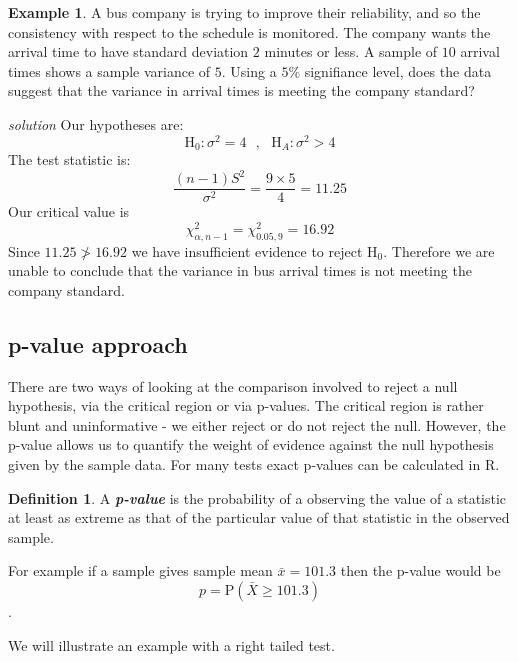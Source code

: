 \documentclass[
]{book}
\theoremstyle{definition}
\newtheorem{definition}{Definition}[chapter]
\theoremstyle{definition}
\newtheorem{example}{Example}[chapter]
\theoremstyle{definition}
\theoremstyle{definition}
\theoremstyle{remark}
\begin{document}
\begin{example}
A bus company is trying to improve their reliability, and so the consistency with respect to the schedule is monitored. The company wants the arrival time to have standard deviation \(2\) minutes or less. A sample of \(10\) arrival times shows a sample variance of \(5\). Using a \(5\%\) signifiance level, does the data suggest that the variance in arrival times is meeting the company standard?

\emph{solution}
Our hypotheses are:
\[\text{H}_0: \sigma^2=4 \ \ \ , \ \ \ \text{H}_A: \sigma^2 >4\]
The test statistic is:
\[\frac{(n-1)S^2}{\sigma^2}=\frac{9\times5}{4} = 11.25\]
Our critical value is
\[\chi^2_{\alpha,n-1}=\chi^2_{0.05,9}=16.92\]
Since \(11.25\ngtr16.92\) we have insufficient evidence to reject \(\text{H}_0\). Therefore we are unable to conclude that the variance in bus arrival times is not meeting the company standard.
\end{example}

\hypertarget{p-value-approach}{%
\subsection{p-value approach}\label{p-value-approach}}

There are two ways of looking at the comparison involved to reject a null hypothesis, via the critical region or via p-values. The critical region is rather blunt and uninformative - we either reject or do not reject the null. However, the p-value allows us to quantify the weight of evidence against the null hypothesis given by the sample data. For many tests exact p-values can be calculated in R.

\begin{definition}
A \textbf{\emph{p-value}} is the probability of a observing the value of a statistic at least as extreme as that of the particular value of that statistic in the observed sample.

For example if a sample gives sample mean \(\bar{x}=101.3\) then the p-value would be \[p  =\text{P}(\bar{X}\geq101.3)\].
\end{definition}

We will illustrate an example with a right tailed test.
\end{document}
